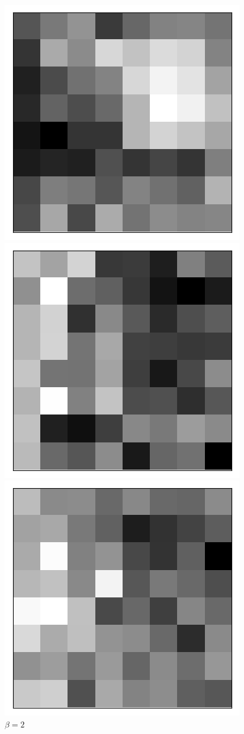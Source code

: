 \begin{figure}[h!]
\begin{multicols}{4}
    \includegraphics[scale=0.4]{figures/results/latent_image/beta_1_sample_90_latent.png}
    \caption{$\beta=1$}
    \includegraphics[scale=0.4]{figures/results/latent_image/beta_2_sample_90_latent.png}
    \caption{$\beta=2$}
    \includegraphics[scale=0.4]{figures/results/latent_image/beta_4_sample_90_latent.png}

\end{multicols}
\end{figure}
